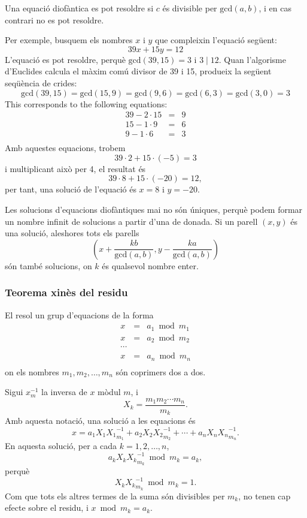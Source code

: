 Una equació diofàntica es pot resoldre si $c$ és divisible per
$\textrm{gcd}(a,b)$, i en cas contrari no es pot resoldre.

Per exemple, busquem els nombres $x$ i $y$ que compleixin l'equació
següent:
\[
39x + 15y = 12
\]
L'equació es pot resoldre, perquè $\textrm{gcd}(39,15)=3$ i $3 \mid
12$. Quan l'algorisme d'Euclides calcula el màxim comú divisor de 39 i
15, produeix la següent seqüència de crides:
\[
\textrm{gcd}(39,15) = \textrm{gcd}(15,9)
= \textrm{gcd}(9,6) = \textrm{gcd}(6,3)
= \textrm{gcd}(3,0) = 3 \]
This corresponds to the following equations:
\[
\begin{array}{lcl}
39 - 2 \cdot 15 & = & 9 \\
15 - 1 \cdot 9 & = & 6 \\
9 - 1 \cdot 6 & = & 3 \\
\end{array}
\]
Amb aquestes equacions, trobem
\[
39 \cdot 2 + 15 \cdot (-5) = 3
\]
i multiplicant això per 4, el resultat és
\[
39 \cdot 8 + 15 \cdot (-20) = 12,
\]
per tant, una solució de l'equació és $x=8$ i $y=-20$.

Les solucions d'equacions diofàntiques mai no són úniques, perquè podem formar
un nombre infinit de solucions a partir d'una de donada. Si un parell
$(x,y)$ és una solució, aleshores tots els parells
\[(x+\frac{kb}{\textrm{gcd}(a,b)},y-\frac{ka}{\textrm{gcd}(a,b)})\]
són també solucions, on $k$ és qualsevol nombre enter.

\subsubsection{Teorema xinès del residu}


El  resol un grup d'equacions de la forma
\[
\begin{array}{lcl}
x & = & a_1 \bmod m_1 \\
x & = & a_2 \bmod m_2 \\
\cdots \\
x & = & a_n \bmod m_n \\
\end{array}
\]
on els nombres $m_1,m_2,\ldots,m_n$ són coprimers dos a dos.

Sigui $x^{-1}_m$ la inversa de $x$ mòdul $m$, i
\[ X_k = \frac{m_1 m_2 \cdots m_n}{m_k}.\]
Amb aquesta notació, una solució a les equacions és
\[x = a_1 X_1 {X_1}^{-1}_{m_1} + a_2 X_2 {X_2}^{-1}_{m_2} + \cdots + a_n X_n {X_n}^{-1}_{m_n}.\]
En aquesta solució, per a cada $k=1,2,\ldots,n$,
\[a_k X_k {X_k}^{-1}_{m_k} \bmod m_k = a_k,\]
perquè
\[X_k {X_k}^{-1}_{m_k} \bmod m_k = 1.\]
Com que tots els altres termes de la suma són divisibles per $m_k$, no tenen
cap efecte sobre el residu, i $x \bmod m_k = a_k$.

